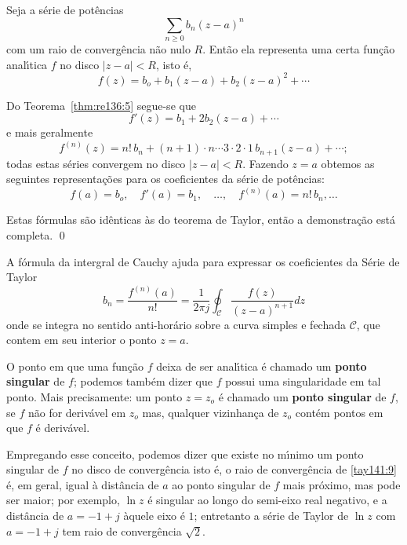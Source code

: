 \begin{prova}
Seja a s\'{e}rie de pot\^{e}ncias
\begin{equation*}
  \sum_{n\geq 0}b_n(z - a)^n
\end{equation*}
com um raio de converg\^{e}ncia n\~{a}o nulo $R$. Ent\~{a}o ela representa uma
certa fun\c{c}\~{a}o anal\'{\i}tica $f$ no disco $| z - a | < R$, isto \'{e},
\begin{equation*}
f(z) = b_o + b_1(z -a) + b_2(z - a)^2 +\cdots
\end{equation*}

Do Teorema~\ref{thm:re136:5} segue-se que
\begin{equation*}
  f'(z) = b_1 + 2b_2(z - a) +\cdots
\end{equation*}
e mais geralmente
\begin{equation*}
f^{(n)}(z) = n!\, b_n + (n + 1)\cdot n \cdots 3\cdot2\cdot1\,
b_{n+1}(z - a) +\cdots;
\end{equation*}
todas estas s\'{e}ries convergem no disco $| z - a | < R$. Fazendo $z
= a$ obtemos as seguintes representa\c{c}\~{o}es para os coeficientes da
s\'{e}rie de pot\^{e}ncias:
\begin{equation*}
f(a) = b_o,\quad f'(a) = b_1,\quad\ldots,\quad f^{(n)}(a) = n!
\,b_n,\ldots
\end{equation*}

Estas f\'{o}rmulas s\~{a}o id\^{e}nticas \`{a}s do teorema de Taylor, ent\~{a}o a
demonstra\c{c}\~{a}o est\'{a} completa. \qed
\end{prova}

A f\'{o}rmula da intergral de Cauchy ajuda para expressar os
coeficientes da S\'{e}rie de Taylor
\begin{equation*}
    b_n=\frac{f^{(n)}(a)}{n!}=\frac{1}{2\pi
    j}\oint_{\mathcal{C}}\frac{f(z)}{(z-a)^{n+1}}dz
\end{equation*}
onde se integra no sentido anti-hor\'{a}rio sobre a curva simples e
fechada $\mathcal{C}$, que contem em seu interior o ponto $z=a$.

O ponto em que uma fun\c{c}\~{a}o $f$ deixa de ser anal\'{\i}tica \'{e} chamado um
\textbf{ponto singular} de $f$; podemos tamb\'{e}m dizer que $f$
possui uma singularidade em tal ponto. Mais precisamente: um ponto
$z =z_o$ \'{e} chamado um \textbf{ponto singular} de $f$, se $f$ n\~{a}o
for deriv\'{a}vel em $z_o$ mas, qualquer vizinhan\c{c}a de $z_o$ cont\'{e}m
pontos em que $f$ \'{e} deriv\'{a}vel.

Empregando esse conceito, podemos dizer que existe no m\'{\i}nimo um
ponto singular de $f$ no disco de converg\^{e}ncia isto \'{e}, o raio de
converg\^{e}ncia de \eqref{tay141:9} \'{e}, em geral, igual \`{a} dist\^{a}ncia de
$a$ ao ponto singular de $f$ mais pr\'{o}ximo, mas pode ser maior; por
exemplo, $\ln z$ \'{e} singular ao longo do semi-eixo real negativo, e
a dist\^{a}ncia de $a = - 1 + j$ \`{a}quele eixo \'{e} $1$; entretanto a s\'{e}rie
de Taylor de $\ln z$ com $a = - 1 + j$ tem  raio de converg\^{e}ncia
$\sqrt{2}$.

